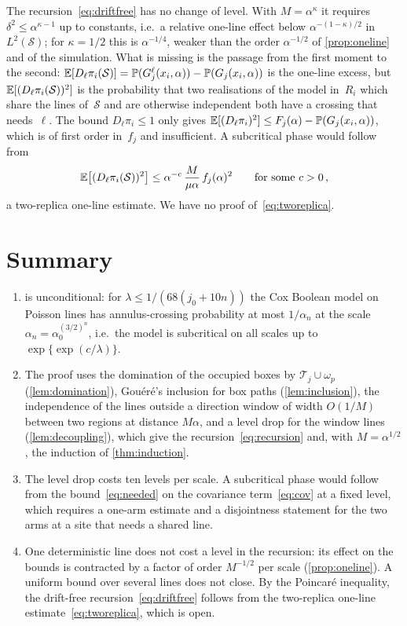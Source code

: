 \documentclass[11pt,letterpaper]{article}
\newcommand{\cT}{\mathcal T}
\newcommand{\cS}{\mathcal S}
\begin{document}
The recursion~\eqref{eq:driftfree} has no change of level. With $M=\alpha^{\kappa}$ it requires $\delta^2\le\alpha^{\kappa-1}$ up to constants, i.e.\ a relative one-line effect below $\alpha^{-(1-\kappa)/2}$ in $L^2(\cS)$; for $\kappa=1/2$ this is $\alpha^{-1/4}$, weaker than the order $\alpha^{-1/2}$ of \cref{prop:oneline} and of the simulation. What is missing is the passage from the first moment to the second: $\E[D_\ell\pi_i(\cS)]=\P(G^\ell_j(x_i,\alpha))-\P(G_j(x_i,\alpha))$ is the one-line excess, but $\E[(D_\ell\pi_i(\cS))^2]$ is the probability that two realisations of the model in~$R_i$ which share the lines of~$\cS$ and are otherwise independent both have a crossing that needs~$\ell$. The bound $D_\ell\pi_i\le1$ only gives $\mathbb E[(D_\ell\pi_i)^2]\le F_j(\alpha)-\mathbb P(G_j(x_i,\alpha))$, which is of first order in~$f_j$ and insufficient. A subcritical phase would follow from
\begin{equation}
\label{eq:tworeplica}
  \E\bigl[(D_\ell\pi_i(\cS))^2\bigr]\le\alpha^{-c}\,\frac{M}{\mu\alpha}\,f_j(\alpha)^2\qquad\text{for some }c>0\,,
\end{equation}
a two-replica one-line estimate. We have no proof of~\eqref{eq:tworeplica}.

\section{Summary}
\label{sec:summary}

\begin{enumerate}
  \item {} is unconditional: for $\lambda\le1/(68(j_0+10n))$ the Cox Boolean model on Poisson lines has annulus-crossing probability at most $1/\alpha_n$ at the scale $\alpha_n=\alpha_0^{(3/2)^n}$, i.e.\ the model is subcritical on all scales up to $\exp\{\exp(c/\lambda)\}$.
  \item The proof uses the domination of the occupied boxes by $\cT_j\cup\omega_p$ (\cref{lem:domination}), Gou\'er\'e's inclusion for box paths (\cref{lem:inclusion}), the independence of the lines outside a direction window of width $O(1/M)$ between two regions at distance $M\alpha$, and a level drop for the window lines (\cref{lem:decoupling}), which give the recursion~\eqref{eq:recursion} and, with $M=\alpha^{1/2}$, the induction of \cref{thm:induction}.
  \item The level drop costs ten levels per scale. A subcritical phase would follow from the bound~\eqref{eq:needed} on the covariance term~\eqref{eq:cov} at a fixed level, which requires a one-arm estimate and a disjointness statement for the two arms at a site that needs a shared line.
  \item One deterministic line does not cost a level in the recursion: its effect on the bounds is contracted by a factor of order $M^{-1/2}$ per scale (\cref{prop:oneline}). A uniform bound over several lines does not close. By the Poincar\'e inequality, the drift-free recursion~\eqref{eq:driftfree} follows from the two-replica one-line estimate~\eqref{eq:tworeplica}, which is open.
\end{enumerate}
\end{document}
